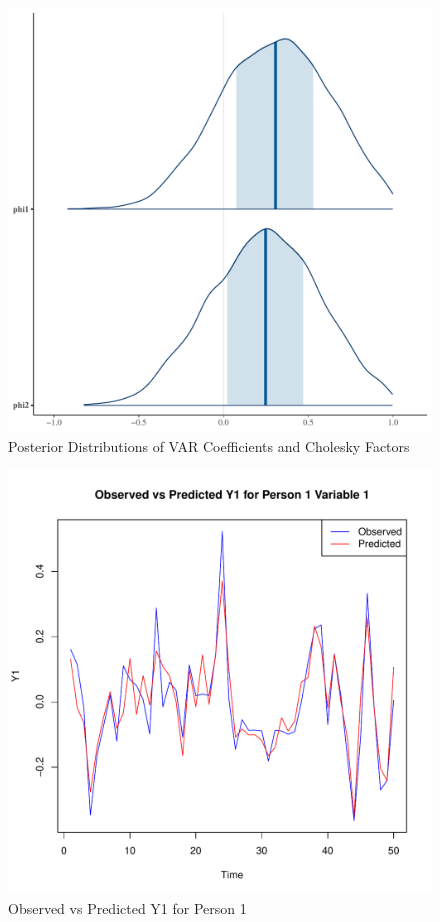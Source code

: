 \documentclass{article}
\begin{document}
\begin{figure}[h]
  \centering
  \includegraphics[width=\textwidth]{posterior_distributions_VAR.pdf}
  \caption{Posterior Distributions of VAR Coefficients and Cholesky Factors}
\end{figure}

\begin{figure}[h]
  \centering
  \includegraphics[width=\textwidth]{predicted_vs_observed_y1.pdf}
  \caption{Observed vs Predicted Y1 for Person 1}
\end{figure}
\end{document}

